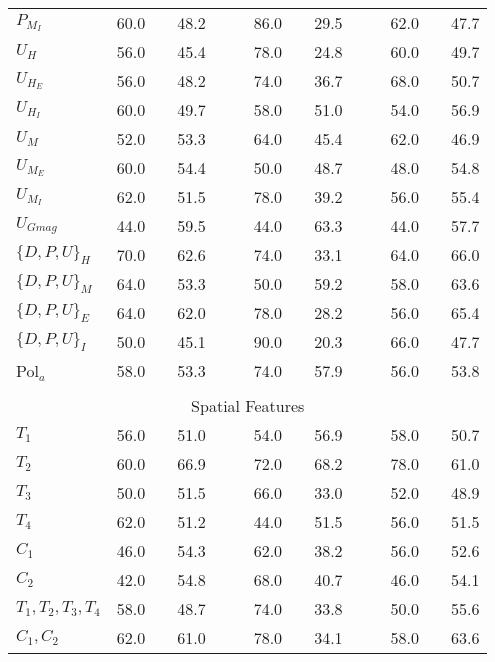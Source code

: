 \begin{table}
\begin{center}
{{\begin{tabular}{l lcr cc lcr cc lcr }
$P_{M_{I}}$ & 60.0 & & 48.2 & & & 	86.0 & & 29.5 & & & 62.0 & & 47.7\\
$U_{H}$ 	    & 56.0 & & 45.4 & & & 78.0 & & 24.8 & & & 60.0 & & 49.7\\
$U_{H_{E}}$ & 56.0 & & 48.2 & & & 	74.0 & & 36.7 & & & 	68.0 & & 50.7\\
$U_{H_{I}}$ & 60.0 & & 49.7 & & & 	58.0 & & 51.0 & & & 	54.0 & & 56.9\\
$U_{M}$	 	& 52.0 & & 53.3 & & & 	64.0 & & 45.4 & & & 62.0 & & 46.9\\
$U_{M_{E}}$ & 60.0 & & 54.4 & & & 	50.0 & & 48.7 & & & 	48.0 & & 54.8\\
$U_{M_{I}}$ & 62.0 & & 51.5 & & & 	78.0 & & 39.2 & & & 	56.0 & & 55.4\\
$U_{Gmag}$  & 44.0 & & 59.5 & & & 	44.0 & & 63.3 & & & 	44.0 & & 57.7\\
$\{D,P,U\}_{H}$ & \cellcolor[gray]{0.8}70.0 &\cellcolor[gray]{0.8} &\cellcolor[gray]{0.8} 62.6 & & & 	74.0 & & 33.1 & & & 	64.0 & & 66.0\\
$\{D,P,U\}_{M}$ & 64.0 & & 53.3 & & & 	50.0 & & 59.2 & & & 	58.0 & & 63.6\\
$\{D,P,U\}_{E}$ &  64.0 & & 62.0 & & & 	78.0 & & 28.2 & & & 	56.0 & & 65.4\\
$\{D,P,U\}_{I}$ & 50.0 & & 45.1 & & & 	90.0 & & 20.3 & & & 66.0 & & 47.7\\
Pol$_{a}$ 		& 58.0 & & 53.3 & & & 	74.0 & & 57.9 & & & 	56.0 & & 53.8\\\\[-2ex]
\midrule
\multicolumn{14}{c}{Spatial Features}\\
\midrule
$T_{1}$& 56.0 & & 51.0 & & & 54.0 & & 56.9 & & & 58.0 & & 50.7 \\
$T_{2}$ & \cellcolor[gray]{0.8}60.0 &\cellcolor[gray]{0.8} & \cellcolor[gray]{0.8}66.9 & & & \cellcolor[gray]{0.8}72.0 &\cellcolor[gray]{0.8} & \cellcolor[gray]{0.8}68.2 & & & \cellcolor[gray]{0.8}78.0 & \cellcolor[gray]{0.8}& \cellcolor[gray]{0.8}61.0\\
$T_{3}$ & 50.0 & & 51.5 & & & 66.0 & & 33.0 & & & 52.0 & & 48.9\\
$T_{4}$ & 62.0 & & 51.2 & & & 44.0 & & 51.5 & & & 56.0 & & 51.5\\
$C_{1}$ & 46.0 & & 54.3 & & & 62.0 & & 38.2 & & & 56.0 & & 52.6\\
$C_{2}$ & 42.0 & & 54.8 & & & 68.0 & & 40.7 & & & 46.0 & & 54.1\\
$T_{1},T_{2},T_{3},T_{4}$& 58.0 & & 48.7 & & & 74.0 & & 33.8 & & & 50.0 & & 55.6 \\
$C_{1},C_{2}$ & \cellcolor[gray]{0.8}62.0 &\cellcolor[gray]{0.8} &\cellcolor[gray]{0.8} 61.0 & & & 78.0 & & 34.1 & & & 58.0 & & 63.6\\
\bottomrule

\end{tabular}}}
\end{center}
\label{tab:table8}
\end{table}



















